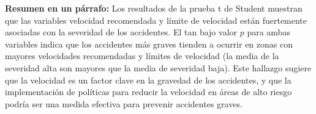 \documentclass{book}
\begin{document}
\textbf{Resumen en un párrafo:} 
Los resultados de la prueba t de Student muestran que las variables velocidad recomendada y límite de velocidad están fuertemente asociadas con la severidad de los accidentes. El tan bajo valor $p$ para ambas variables indica que los accidentes más graves tienden a ocurrir en zonas con mayores velocidades recomendadas y límites de velocidad (la media de la severidad alta son mayores que la media de severidad baja). Este hallazgo sugiere que la velocidad es un factor clave en la gravedad de los accidentes, y que la implementación de políticas para reducir la velocidad en áreas de alto riesgo podría ser una medida efectiva para prevenir accidentes graves.




\nocite{*}
\end{document}
